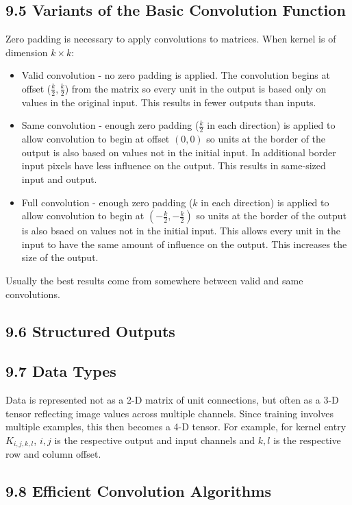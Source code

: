\documentclass[a4paper]{report}
\begin{document}
\subsection{9.5 Variants of the Basic Convolution Function}
Zero padding is necessary to apply convolutions to matrices. When kernel is of dimension $k\times k$:
\begin{itemize}
    \item Valid convolution - no zero padding is applied. The convolution begins at offset ($\frac{k}{2},\frac{k}{2}$) from the matrix so every unit in the output is based only on values in the original input. This results in fewer outputs than inputs.
    \item Same convolution - enough zero padding ($\frac{k}{2}$ in each direction) is applied to allow convolution to begin at offset $(0,0)$ so units at the border of the output is also based on values not in the initial input. In additional border input pixels have less influence on the output. This results in same-sized input and output.
    \item Full convolution - enough zero padding ($k$ in each direction) is applied to allow convolution to begin at $(-\frac{k}{2},-\frac{k}{2})$ so units at the border of the output is also bsaed on values not in the initial input. This allows every unit in the input to have the same amount of influence on the output. This increases the size of the output.
\end{itemize}
Usually the best results come from somewhere between valid and same convolutions.

\subsection{9.6 Structured Outputs}
\subsection{9.7 Data Types}
Data is represented not as a 2-D matrix of unit connections, but often as a 3-D tensor reflecting image values across multiple channels. Since training involves multiple examples, this then becomes a 4-D tensor. For example, for kernel entry $K_{i,j,k,l}$, $i,j$ is the respective output and input channels and $k,l$ is the respective row and column offset.

\subsection{9.8 Efficient Convolution Algorithms}
\end{document}
